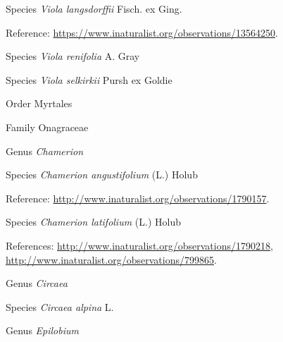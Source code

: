 \documentclass[9pt, article]{memoir}
\begin{document}
\begin{multicols}{2}
\vspace{6pt}\noindent\hspace{36pt}Species \textit{Viola langsdorffii} Fisch. ex Ging.


\vspace{6pt}Reference: 
\url{https://www.inaturalist.org/observations/13564250}.

\vspace{6pt}\noindent\hspace{36pt}Species \textit{Viola renifolia} A. Gray


\vspace{6pt}\noindent\hspace{36pt}Species \textit{Viola selkirkii} Pursh ex Goldie


\vspace{6pt}\noindent\hspace{18pt}Order Myrtales


\vspace{6pt}\noindent\hspace{24pt}Family Onagraceae


\vspace{6pt}\noindent\hspace{30pt}Genus \textit{Chamerion}


\vspace{6pt}\noindent\hspace{36pt}Species \textit{Chamerion angustifolium} (L.) Holub


\vspace{6pt}Reference: 
\url{http://www.inaturalist.org/observations/1790157}.

\vspace{6pt}\noindent\hspace{36pt}Species \textit{Chamerion latifolium} (L.) Holub


\vspace{6pt}References: 
\url{http://www.inaturalist.org/observations/1790218}, 
\url{http://www.inaturalist.org/observations/799865}.

\vspace{6pt}\noindent\hspace{30pt}Genus \textit{Circaea}


\vspace{6pt}\noindent\hspace{36pt}Species \textit{Circaea alpina} L.


\vspace{6pt}\noindent\hspace{30pt}Genus \textit{Epilobium}



\end{multicols}
\end{document}
